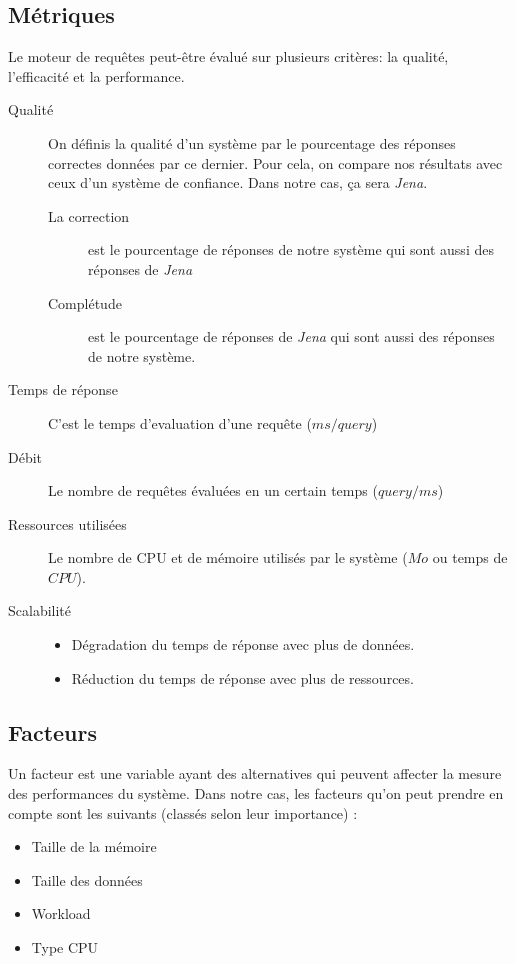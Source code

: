 \documentclass[12pt,titlepage]{article}
\begin{document}
\subsection{Métriques}

Le moteur de requêtes peut-être évalué sur plusieurs critères: la qualité, l'efficacité et la performance. 


\begin{description}
  \item[Qualité] On définis la qualité d'un système par le pourcentage des réponses correctes données par ce dernier. Pour cela, on compare nos résultats avec ceux d'un système de confiance. Dans notre cas, ça sera \textit{Jena}.

  \begin{description}
    \item[La correction] est le pourcentage de réponses de notre système qui sont aussi des réponses de \textit{Jena}
    \item[Complétude] est le pourcentage de réponses de \textit{Jena} qui sont aussi des réponses de notre système.
  \end{description}

  \item[Temps de réponse] C'est le temps d'evaluation d'une requête ($ms / query$)
  \item[Débit] Le nombre de requêtes évaluées en un certain temps ($query / ms$)
  \item[Ressources utilisées] Le nombre de CPU et de mémoire utilisés par le système ($Mo$ ou temps de $CPU$).
  \item[Scalabilité]
  \begin{itemize}
    \item Dégradation du temps de réponse avec plus de données.
    \item Réduction du temps de réponse avec plus de ressources.
  \end{itemize}
\end{description}

\subsection{Facteurs}

Un facteur est une variable ayant des alternatives qui peuvent affecter la mesure des performances du système. Dans notre cas, les facteurs qu'on peut prendre en compte sont les suivants (classés selon leur importance) :

\begin{itemize}
  \item Taille de la mémoire
  \item Taille des données
  \item Workload
  \item Type CPU
\end{itemize}
\end{document}
